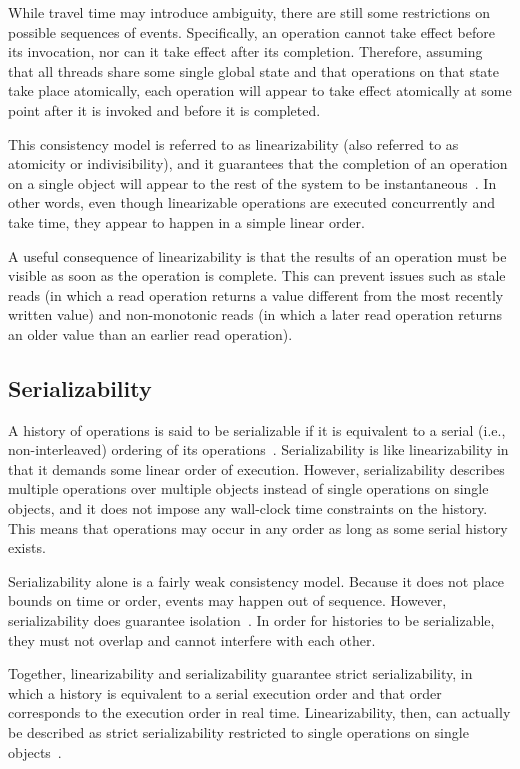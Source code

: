 \documentclass{sig-alternate}
\begin{document}
While travel time may introduce ambiguity, there are still some restrictions on possible sequences of events. Specifically, an operation cannot take effect before its invocation, nor can it take effect after its completion. Therefore, assuming that all threads share some single global state and that operations on that state take place atomically, each operation will appear to take effect atomically at some point after it is invoked and before it is completed.

This consistency model is referred to as linearizability (also referred to as atomicity or indivisibility), and it guarantees that the completion of an operation on a single object will appear to the rest of the system to be instantaneous~\cite{Herlihy1990}. In other words, even though linearizable operations are executed concurrently and take time, they appear to happen in a simple linear order.

A useful consequence of linearizability is that the results of an operation must be visible as soon as the operation is complete. This can prevent issues such as stale reads (in which a read operation returns a value different from the most recently written value) and non-monotonic reads (in which a later read operation returns an older value than an earlier read operation).

\subsection{Serializability}

A history of operations is said to be serializable if it is equivalent to a serial (i.e., non-interleaved) ordering of its operations~\cite{Herlihy1990}. Serializability is like linearizability in that it demands some linear order of execution. However, serializability describes multiple operations over multiple objects instead of single operations on single objects, and it does not impose any wall-clock time constraints on the history. This means that operations may occur in any order as long as some serial history exists.

Serializability alone is a fairly weak consistency model. Because it does not place bounds on time or order, events may happen out of sequence. However, serializability does guarantee isolation~\cite{Haerder1983}. In order for histories to be serializable, they must not overlap and cannot interfere with each other.

Together, linearizability and serializability guarantee strict serializability, in which a history is equivalent to a serial execution order and that order corresponds to the execution order in real time. Linearizability, then, can actually be described as strict serializability restricted to single operations on single objects~\cite{Herlihy1990}.
\end{document}

